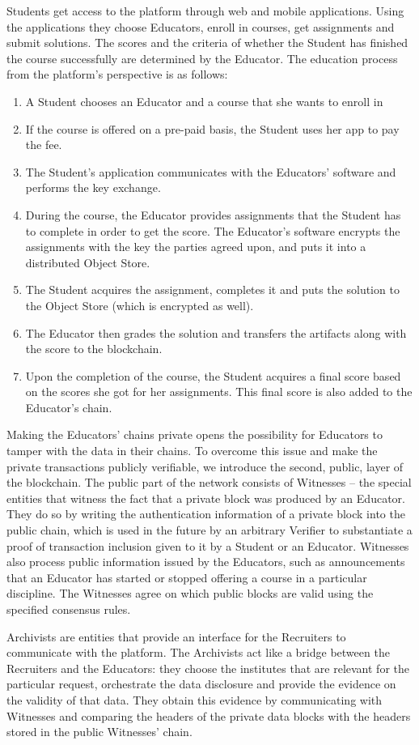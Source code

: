 Students get access to the platform through web and mobile applications. Using the applications they choose Educators, enroll in courses, get assignments and submit solutions. The scores and the criteria of whether the Student has finished the course successfully are determined by the Educator. The education process from the platform’s perspective is as follows:
\begin{enumerate}
\item A Student chooses an Educator and a course that she wants to enroll in
\item If the course is offered on a pre-paid basis, the Student uses her app to pay the fee.
\item The Student’s application communicates with the Educators’ software and performs the key exchange.
\item During the course, the Educator provides assignments that the Student has to complete in order to get the score. The Educator’s software encrypts the assignments with the key the parties agreed upon, and puts it into a distributed Object Store.
\item The Student acquires the assignment, completes it and puts the solution to the Object Store (which is encrypted as well).
\item The Educator then grades the solution and transfers the artifacts along with the score to the blockchain.
\item Upon the completion of the course, the Student acquires a final score based on the scores she got for her assignments. This final score is also added to the Educator’s chain.
\end{enumerate}

Making the Educators' chains private opens the possibility for Educators to tamper with the data in their chains. To overcome this issue and make the private transactions publicly verifiable, we introduce the second, public, layer of the blockchain. The public part of the network consists
of Witnesses – the special entities that witness the fact that a private block was produced by an  Educator.
They do so by writing the authentication information of a private block into the public chain, which is used in the future by an arbitrary Verifier to substantiate a proof of transaction inclusion given to it by a Student or an Educator. Witnesses also process public information issued by the Educators, such as announcements that an Educator has started or stopped offering a course in a particular discipline. The Witnesses agree on which public blocks are valid using the specified consensus rules.

Archivists are entities that provide an interface for the Recruiters to communicate with the platform. The Archivists act like a bridge between the Recruiters and the Educators: they choose the institutes that are relevant for the particular request, orchestrate the data disclosure and provide the evidence on the validity of that data. They obtain this evidence by communicating with Witnesses and comparing the headers of the private data blocks with the headers stored in the public Witnesses' chain.
